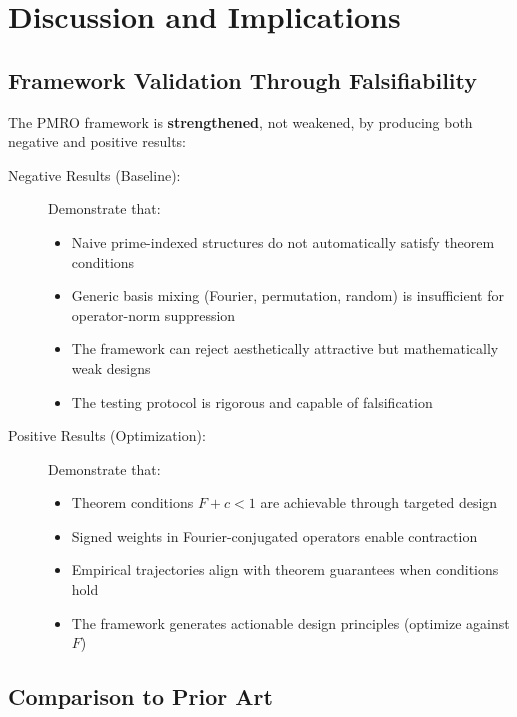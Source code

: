 \documentclass[11pt,a4paper]{article}
\begin{document}
\section{Discussion and Implications}

\subsection{Framework Validation Through Falsifiability}

The PMRO framework is \textbf{strengthened}, not weakened, by producing both negative and positive results:

\begin{description}
\item[Negative Results (Baseline):] Demonstrate that:
\begin{itemize}
\item Naive prime-indexed structures do not automatically satisfy theorem conditions
\item Generic basis mixing (Fourier, permutation, random) is insufficient for operator-norm suppression
\item The framework can reject aesthetically attractive but mathematically weak designs
\item The testing protocol is rigorous and capable of falsification
\end{itemize}

\item[Positive Results (Optimization):] Demonstrate that:
\begin{itemize}
\item Theorem conditions \(F+c<1\) are achievable through targeted design
\item Signed weights in Fourier-conjugated operators enable contraction
\item Empirical trajectories align with theorem guarantees when conditions hold
\item The framework generates actionable design principles (optimize against \(F\))
\end{itemize}
\end{description}

\subsection{Comparison to Prior Art}
\end{document}
